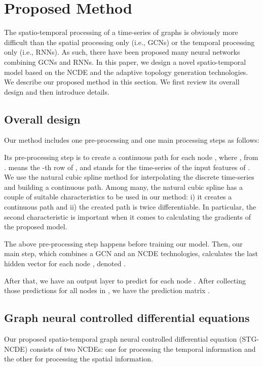 \documentclass[letterpaper]{article} \usepackage{aaai22}  \usepackage{times}  \usepackage{helvet}  \usepackage{courier}  \usepackage[hyphens]{url}  \usepackage{graphicx} \urlstyle{rm} \def\UrlFont{\rm}  \usepackage{natbib}  \usepackage{caption} \DeclareCaptionStyle{ruled}{labelfont=normalfont,labelsep=colon,strut=off} \frenchspacing  \setlength{\pdfpagewidth}{8.5in}  \setlength{\pdfpageheight}{11in}  \usepackage{stfloats}
\begin{document}
\section{Proposed Method}
The spatio-temporal processing of a time-series of graphs  is obviously more difficult than the spatial processing only (i.e., GCNs) or the temporal processing only (i.e., RNNs). As such, there have been proposed many neural networks combining GCNs and RNNs. In this paper, we design a novel spatio-temporal model based on the NCDE and the adaptive topology generation technologies. We describe our proposed method in this section. We first review its overall design and then introduce details.


\subsection{Overall design}


Our method includes one pre-processing and one main processing steps as follows:
\begin{compactenum}
    \item Its pre-processing step is to create a continuous path  for each node , where , from .  means the -th row of , and  stands for the time-series of the input features of . We use the natural cubic spline method for interpolating the discrete time-series  and building a continuous path. Among many, the natural cubic spline has a couple of suitable characteristics to be used in our method: i) it creates a continuous path and ii) the created path is twice differentiable. In particular, the second characteristic is important when it comes to calculating the gradients of the proposed model.
    \item The above pre-processing step happens before training our model. Then, our main step, which combines a GCN and an NCDE technologies, calculates the last hidden vector for each node , denoted .
    \item After that, we have an output layer to predict  for each node . After collecting those predictions for all nodes in , we have the prediction matrix .
\end{compactenum}

\subsection{Graph neural controlled differential equations}
Our proposed spatio-temporal graph neural controlled differential equation (STG-NCDE) consists of two NCDEs: one for processing the temporal information and the other for processing the spatial information.
\end{document}
